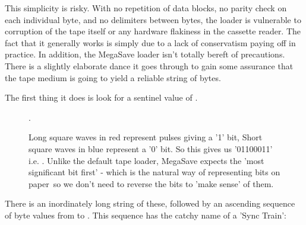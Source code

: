  
	
This simplicity is risky. With no repetition of data blocks, no parity check on each individual byte, and no delimiters between
bytes, the loader is vulnerable to corruption of the tape itself or any hardware flakiness in the cassette reader. The fact
that it generally works is simply due to a lack of conservatism paying off in practice. In addition, the MegaSave loader isn't
totally bereft of precautions. There is a slightly elaborate dance it goes through to gain some assurance that the tape
medium is going to yield a reliable string of bytes.

The first thing it does is look for a sentinel value of . 

\begin{figure}[H]
{
	\begin{adjustbox}{width=14cm,center}
	\end{adjustbox}
}\caption[]{Long square waves in red represent pulses giving a '1' bit, Short square waves in blue represent a '0' bit. So this gives
	us '01100011'\, i.e. . Unlike the default tape loader, MegaSave expects the 'most significant bit first' - which is the
natural way of representing bits on paper\, so we don't need to reverse the bits to 'make sense' of them.}.
	\end{figure}

There is an inordinately long string of these, followed by an ascending sequence of byte values from  to .
This sequence has the catchy name of a 'Sync Train':

